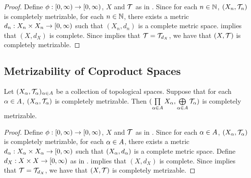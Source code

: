 \documentclass{book}
\begin{document}
\begin{proof}
	Define $\phi: [0,\infty) \rightarrow [0,\infty)$, $X$ and $\mathcal{T}$ as in . Since for each $n \in \mathbb{N}$, $(X_n, \mathcal{T}_n)$ is completely metrizable, for each $n \in \mathbb{N}$, there exists a metric $d_n:X_n \times X_n \rightarrow [0,\infty)$ such that $(X_n, d_n)$ is a complete metric space.  implies that $(X, d_X)$ is complete. Since  implies that $\mathcal{T} = \mathcal{T}_{d_X}$, we have that $(X, \mathcal{T})$ is completely metrizable. 
\end{proof}



























\subsection{Metrizability of Coproduct Spaces}


\begin{ex} 
	Let $(X_{\alpha}, \mathcal{T}_{\alpha})_{\alpha \in A}$ be a collection of topological spaces. Suppose that for each ${\alpha} \in A$, $(X_{\alpha}, \mathcal{T}_{\alpha})$ is completely metrizable. Then $(\prod\limits_{\alpha \in A} X_{\alpha}, \bigoplus\limits_{\alpha \in A} \mathcal{T}_\alpha)$ is completely metrizable.  
\end{ex}

\begin{proof}
	Define $\phi: [0,\infty) \rightarrow [0,\infty)$, $X$ and $\mathcal{T}$ as in . Since for each $\alpha \in A$, $(X_{\alpha}, \mathcal{T}_{\alpha})$ is completely metrizable, for each $\alpha \in A$, there exists a metric $d_{\alpha}:X_{\alpha} \times X_{\alpha} \rightarrow [0,\infty)$ such that $(X_{\alpha}, d_{\alpha})$ is a complete metric space. Define $d_X:X \times X \rightarrow [0,\infty)$ as in .  implies that $(X, d_X)$ is complete. Since  implies that $\mathcal{T} = \mathcal{T}_{d_X}$, we have that $(X, \mathcal{T})$ is completely metrizable. 
\end{proof}
\end{document}
